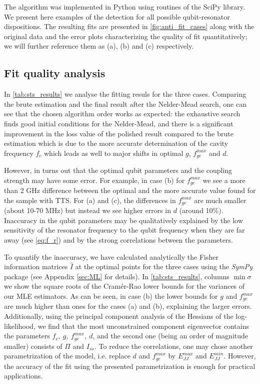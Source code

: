 \documentclass[%
 aip,
 draft,
 amsmath,amssymb,
 reprint,%
]{revtex4-1}
\begin{document}
The algorithm was implemented in Python using  routines of the SciPy\cite{scipy} library. We present here examples of the detection for all possible qubit-resonator dispositions.  The resulting fits are presented in \autoref{fig:anti_fit_cases} along with the original data and the error plots characterizing the quality of fit quantitatively; we will further reference them as (a), (b) and (c) respectively.

\subsection{Fit quality analysis} 

In \autoref{tab:sts_results} we analyse the fitting resuls for the three cases. Comparing the brute estimation and the final result after the Nelder-Mead search, one can see that the chosen algorithm order works as expected: the exhaustive search finds good initial conditions for the Nelder-Mead, and there is a significant improvement in the loss value of the polished result compared to the brute estimation which is due to the more accurate determination of the cavity frequency $f_c$ which leads as well to major shifts in optimal $g$, $f_{ge}^{max}$ and $d$.

However, in turns out that the optimal qubit parameters and the coupling strength may have some error. For example, in case (b) for $f_{ge}^{max}$ we see a more than 2 GHz difference between the optimal and the more accurate value found for the sample with TTS. For (a) and (c), the differences in $f_{ge}^{max}$ are much smaller (about 10-70 MHz) but instead we see higher errors in $d$ (around 10\%). Inaccuracy in the qubit parameters may be qualitatively explained by the low sensitivity of the resonator frequency to the qubit frequency when they are far away (see \eqref{eq:f_r}) and by the strong correlations between the parameters.

To quantify the inaccuracy, we have calculated analytically the Fisher information matrices $\hat I$ at the optimal points for the three cases using the \textit{SymPy}\cite{sympy} package (see Appendix \ref{sec:ML} for details). In \autoref{tab:sts_results}, columns $\min \sigma$ we show the square roots of the Cramér-Rao lower bounds for the variances of our MLE estimators. As can be seen, in case (b) the lower bounds for $g$ and $f_{ge}^{max}$ are much higher than ones for the cases (a) and (b), explaining the larger errors. Additionally, using the principal component analysis of the Hessians of the log-likelihood, we find that the most unconstrained component eigenvector contains the parameters $f_c,\ g,\ f_{ge}^{max},\ d$, and the second one (being an order of magnitude smaller) consists of $\Pi$ and $I_{ss}$. To reduce the correlations, one may chose another parametrization of the model, i.e. replace $d$ and $f_{ge}^{max}$ by $ E_{JJ}^{max} $ and $ E_{JJ}^{min} $. However, the accuracy of the fit using the presented parametrization is enough for practical applications.
\end{document}
